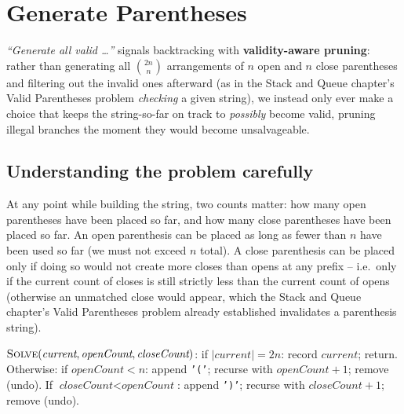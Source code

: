 \section{Generate Parentheses}
\label{sec:rec-generate-parentheses}


\begin{patternbox}
\emph{``Generate all valid \ldots''} signals backtracking with
\textbf{validity-aware pruning}: rather than generating all $\binom{2n}{n}$
arrangements of $n$ open and $n$ close parentheses and filtering out the
invalid ones afterward (as in the Stack and Queue chapter's Valid
Parentheses problem \emph{checking} a given string), we instead only ever make a choice that
keeps the string-so-far on track to \emph{possibly} become valid,
pruning illegal branches the moment they would become unsalvageable.
\end{patternbox}

\subsection*{Understanding the problem carefully}

At any point while building the string, two counts matter: how many
open parentheses have been placed so far, and how many close parentheses
have been placed so far. An open parenthesis can be placed as long as
fewer than $n$ have been used so far (we must not exceed $n$ total). A
close parenthesis can be placed only if doing so would not create more
closes than opens at any prefix -- i.e.\ only if the current count of
closes is still strictly less than the current count of opens (otherwise
an unmatched close would appear, which the Stack and Queue chapter's Valid Parentheses problem
already established invalidates a parenthesis string).

\begin{ideabox}
$\textsc{Solve}(\textit{current}, \textit{openCount}, \textit{closeCount})$:
if $|\textit{current}| = 2n$: record $\textit{current}$; return.
Otherwise: if $\textit{openCount} < n$: append \texttt{'('}; recurse with
$\textit{openCount}+1$; remove (undo). If $\textit{closeCount} <
\textit{openCount}$: append \texttt{')'}; recurse with
$\textit{closeCount}+1$; remove (undo).
\end{ideabox}

